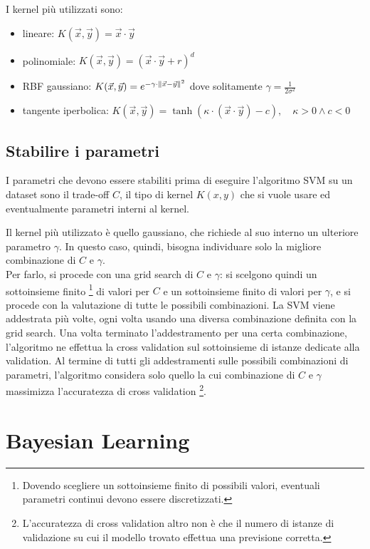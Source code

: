 I kernel più utilizzati sono:
\begin{itemize}
    \item lineare: $K(\Vec{x}, \Vec{y}) = \Vec{x} \cdot \Vec{y}$
    \item polinomiale: $K(\Vec{x}, \Vec{y}) = (\Vec{x} \cdot \Vec{y} + r)^d$
    \item RBF gaussiano: 
    $K(\Vec{x}, \Vec{y}) = e^{-\gamma \cdot \left\lVert\Vec{x} - \Vec{y}\right\rVert^2}$ 
    dove solitamente $\gamma = \frac{1}{2\sigma^2}$
    \item tangente iperbolica: 
    $K(\Vec{x}, \Vec{y}) = 
    \tanh (\kappa \cdot (\Vec{x} \cdot \Vec{y}) - c), \quad \kappa > 0 \land c < 0$
\end{itemize}

\subsection{Stabilire i parametri}
I parametri che devono essere stabiliti prima di eseguire l'algoritmo SVM su un
dataset sono il trade-off $C$, il tipo di kernel $K(x, y)$ che si vuole usare ed
eventualmente parametri interni al kernel.

Il kernel più utilizzato è quello gaussiano, che richiede al suo interno un
ulteriore parametro $\gamma$. In questo caso, quindi, bisogna individuare solo
la migliore combinazione di $C$ e $\gamma$.\\
Per farlo, si procede con una grid search di $C$ e $\gamma$: si scelgono quindi
un sottoinsieme finito 
\footnote{Dovendo scegliere un sottoinsieme finito di possibili valori,
eventuali parametri continui devono essere discretizzati.} 
di valori per $C$ e un sottoinsieme finito di valori per $\gamma$, e si procede
con la valutazione di tutte le possibili combinazioni.
La SVM viene addestrata più volte, ogni volta usando una diversa combinazione
definita con la grid search.
Una volta terminato l'addestramento per una certa combinazione, l'algoritmo ne
effettua la cross validation sul sottoinsieme di istanze dedicate alla
validation.
Al termine di tutti gli addestramenti sulle possibili combinazioni di parametri,
l'algoritmo considera solo quello la cui combinazione di $C$ e $\gamma$
massimizza l'accuratezza di cross validation \footnote{L'accuratezza di cross
validation altro non è che il numero di istanze di validazione su cui il modello
trovato effettua una previsione corretta.}.

\section{Bayesian Learning}
